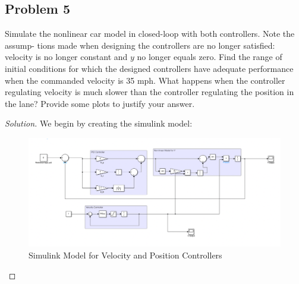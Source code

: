 \documentclass{article}
\begin{document}
\newpage
\subsection*{Problem 5}
Simulate the nonlinear car model in closed-loop with both controllers. Note the assump-
tions made when designing the controllers are no longer satisfied: velocity is no longer
constant and $y$ no longer equals zero. Find the range of initial conditions for which
the designed controllers have adequate performance when the commanded velocity is 35
mph. What happens when the controller regulating velocity is much slower than the
controller regulating the position in the lane? Provide some plots to justify your answer.

\begin{proof}[Solution]
We begin by creating the simulink model:
\begin{figure}[h!]
    \includegraphics[width=\linewidth]{q5model.png}
    \caption{Simulink Model for Velocity and Position Controllers}
\end{figure}


\end{proof}
\end{document}
